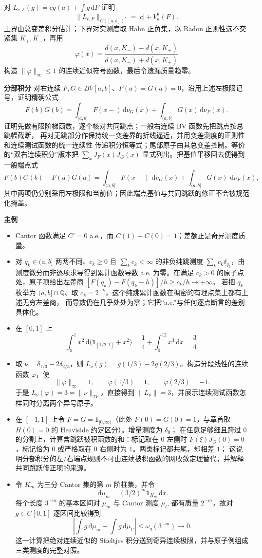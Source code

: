 \documentclass[11pt,a4paper]{ctexart}
\newcommand{\dd}{\,\mathrm d}
\newcommand{\planitem}[1]{\par\smallskip\noindent\textcolor{deepblue}{\textbf{#1}}\quad}
\begin{document}
对 $L_{c,F}(g)=cg(a)+\int g\dd F$ 证明
\[
\|L_{c,F}\|_{C([a,b])^*}=|c|+V_a^b(F).
\]
上界由总变差积分估计；下界对实测度取 Hahn 正负集，以 Radon 正则性选不交紧集 $K_+,K_-$，再用
\[
\varphi(x)=\frac{d(x,K_-)-d(x,K_+)}{d(x,K_-)+d(x,K_+)}
\]
构造 $\|\varphi\|_\infty\le1$ 的连续近似符号函数，最后令遗漏质量趋零。

\planitem{分部积分}
对右连续 $F,G\in BV[a,b]$、$F(a)=G(a)=0$，沿用上述左极限记号，证明精确公式
\[
F(b)G(b)=
\int_{(a,b]}F(x-)\dd\nu_G(x)
+\int_{(a,b]}G(x)\dd\nu_F(x).
\]
证明先做有限阶梯函数，逐个核对共同跳点；一般右连续 BV 函数先把跳点按总跳幅截断，
再对无跳部分作保持统一变差界的折线逼近，并用变差测度的正则性和连续测试函数的统一连续性
传递积分恒等式；尾部原子由其总变差控制。等价的“双右连续积分”版本把
$\sum_xJ_F(x)J_G(x)$ 显式列出。把基值平移回去便得到一般端点式
\[
 F(b)G(b)-F(a)G(a)=
 \int_{(a,b]}F(x-)\,\dd\nu_G(x)+
 \int_{(a,b]}G(x)\,\dd\nu_F(x),
\]
其中两项仍分别采用左极限和当前值；因此端点基值与共同跳跃的修正不会被规范化掩盖。

\planitem{主例}
\begin{itemize}
\item Cantor 函数满足 $C'=0$ a.e.，而 $C(1)-C(0)=1$；差额正是奇异测度质量。
\item 对 $q_k\in(a,b]$ 两两不同、$c_k\ge0$ 且 $\sum_kc_k<\infty$ 的非负纯跳测度
$\sum_kc_k\delta_{q_k}$，由测度微分而非逐项求导得到累计函数导数 a.e. 为零。在满足 $c_k>0$ 的原子点处，原子项给出左差商
$[F(q_k)-F(q_k-h)]/h\ge c_k/h\to+\infty$。
若把 $q_k$ 枚举为 $(a,b]\cap\mathbb Q$、取 $c_k=2^{-k}$，这个纯跳累计函数在稠密的有理点集上都有上述无穷左差商，
而导数仍在几乎处处为零；它把“a.e.”与任何逐点断言的差别具体化。
\item 在 $[0,1]$ 上
\[
\int_0^1x^2\dd\bigl(\mathbf1_{[1/2,1]}+x^2\bigr)
=\frac14+\int_0^12x^3\dd x=\frac34.
\]
\item 取 $\nu=\delta_{1/3}-2\delta_{2/3}$，则
$L_\nu(g)=g(1/3)-2g(2/3)$。构造分段线性的连续函数 $\varphi$，使
\[
\|\varphi\|_\infty=1,\qquad
\varphi(1/3)=1,\qquad \varphi(2/3)=-1.
\]
于是 $L_\nu(\varphi)=3=\|\nu\|_{TV}$，直接得到
$\|L_\nu\|=3$，并展示连续测试函数怎样同时分离两个异号原子。
\item 在 $[-1,1]$ 上令 $F=G=\mathbf1_{[0,\infty)}$（此处 $F(0)=G(0)=1$，与章首取 $H(0)=0$ 的 Heaviside 约定区分）。增量测度为 $\delta_0$；
在任意足够细且跨过 $0$ 的分割上，计算含跳跃被积函数的和：标记取在 $0$ 左侧时
$F(\xi)J_G(0)=0$，标记恰为 $0$ 或严格取在 $0$ 右侧时为 $1$。两类标记都共尾，却相差 $1$；
这说明分部积分的左/右端点规则不可由连续被积函数的网收敛定理替代，并解释共同跳跃修正项的来源。
\item 令 $K_m$ 为三分 Cantor 集的第 $m$ 阶柱集，并令
\[
\dd\mu_m=(3/2)^m\mathbf1_{K_m}\dd x.
\]
每个长度 $3^{-m}$ 的基本区间对 $\mu_m$ 与 Cantor 测度 $\mu_C$ 都有质量 $2^{-m}$，故对 $g\in C[0,1]$ 逐区间比较得到
\[
\left|\int g\dd\mu_m-\int g\dd\mu_C\right|
\le \omega_g(3^{-m})\longrightarrow0.
\]
这一计算把绝对连续近似的 Stieltjes 积分送到奇异连续极限，并与原子例组成三类测度的完整对照。
\end{itemize}
\end{document}
